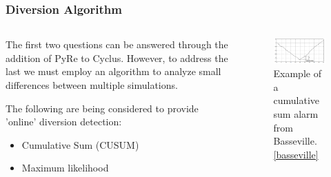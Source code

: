 \begin{frame}
\frametitle{Diversion Algorithm}
\begin{columns}
	\begin{column}{.5\textwidth}
	The first two questions can be answered through the addition of PyRe to Cyclus. However, to address the last we must 
	employ an algorithm to analyze small differences between multiple simulations.

	The following are being considered to provide 'online' diversion detection:
	\begin{itemize}
		\item Cumulative Sum (CUSUM)
		\item Maximum likelihood
	\end{itemize}
	\end{column}
	\begin{column}{.5\textwidth}
		\begin{figure}
		\centering
		\includegraphics[width=\linewidth]{cusum-example}
		\caption{Example of a cumulative sum alarm from Basseville. \ref{basseville}}
		\label{fig:timeseries-waste}
		\end{figure}
	\end{column}
\end{columns} 
\end{frame}
